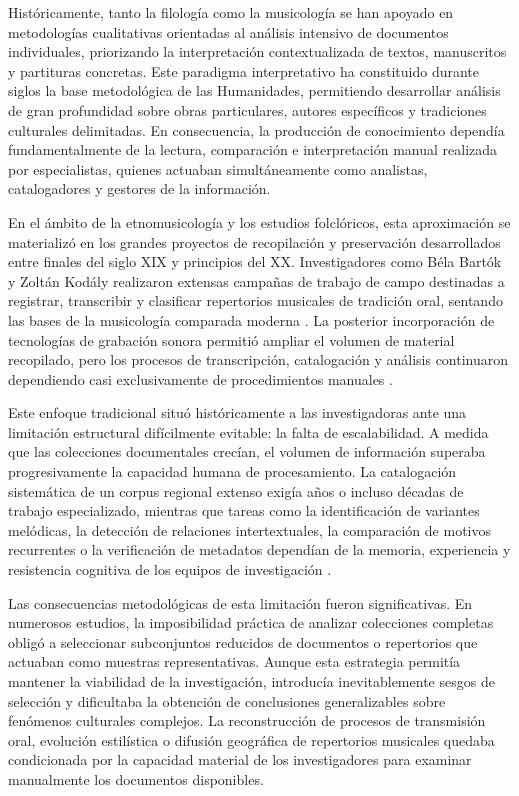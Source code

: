 Históricamente, tanto la filología como la musicología se han apoyado en metodologías cualitativas orientadas al análisis intensivo de documentos individuales, priorizando la interpretación contextualizada de textos, manuscritos y partituras concretas. Este paradigma interpretativo ha constituido durante siglos la base metodológica de las Humanidades, permitiendo desarrollar análisis de gran profundidad sobre obras particulares, autores específicos y tradiciones culturales delimitadas. En consecuencia, la producción de conocimiento dependía fundamentalmente de la lectura, comparación e interpretación manual realizada por especialistas, quienes actuaban simultáneamente como analistas, catalogadores y gestores de la información.

En el ámbito de la etnomusicología y los estudios folclóricos, esta aproximación se materializó en los grandes proyectos de recopilación y preservación desarrollados entre finales del siglo XIX y principios del XX. Investigadores como Béla Bartók y Zoltán Kodály realizaron extensas campañas de trabajo de campo destinadas a registrar, transcribir y clasificar repertorios musicales de tradición oral, sentando las bases de la musicología comparada moderna \citep{bartok1951serbo}. La posterior incorporación de tecnologías de grabación sonora permitió ampliar el volumen de material recopilado, pero los procesos de transcripción, catalogación y análisis continuaron dependiendo casi exclusivamente de procedimientos manuales \citep{seeger1958prescriptive}.

Este enfoque tradicional situó históricamente a las investigadoras ante una limitación estructural difícilmente evitable: la falta de escalabilidad. A medida que las colecciones documentales crecían, el volumen de información superaba progresivamente la capacidad humana de procesamiento. La catalogación sistemática de un corpus regional extenso exigía años o incluso décadas de trabajo especializado, mientras que tareas como la identificación de variantes melódicas, la detección de relaciones intertextuales, la comparación de motivos recurrentes o la verificación de metadatos dependían de la memoria, experiencia y resistencia cognitiva de los equipos de investigación \citep{nettl2015study}.

Las consecuencias metodológicas de esta limitación fueron significativas. En numerosos estudios, la imposibilidad práctica de analizar colecciones completas obligó a seleccionar subconjuntos reducidos de documentos o repertorios que actuaban como muestras representativas. Aunque esta estrategia permitía mantener la viabilidad de la investigación, introducía inevitablemente sesgos de selección y dificultaba la obtención de conclusiones generalizables sobre fenómenos culturales complejos. La reconstrucción de procesos de transmisión oral, evolución estilística o difusión geográfica de repertorios musicales quedaba condicionada por la capacidad material de los investigadores para examinar manualmente los documentos disponibles.

